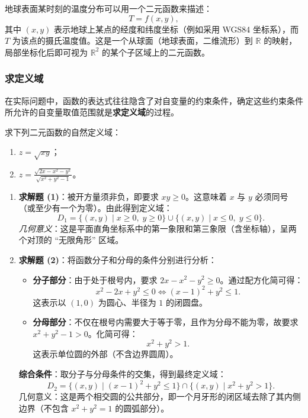 \documentclass[lang=cn,11pt]{elegantbook}
\begin{document}
\begin{exercise}[地表温度模型] \label{ex:temp-function}
地球表面某时刻的温度分布可以用一个二元函数来描述：
\[
T=f(x,y),
\]
其中 $(x,y)$ 表示地球上某点的经度和纬度坐标（例如采用 WGS84 坐标系），而 $T$ 为该点的摄氏温度值。这是一个从球面（地球表面，二维流形）到 $\mathbb{R}$ 的映射，局部坐标化后即可视为 $\mathbb{R}^2$ 的某个子区域上的二元函数。
\end{exercise}


\subsubsection*{求定义域}

在实际问题中，函数的表达式往往隐含了对自变量的约束条件，确定这些约束条件所允许的自变量取值范围就是\textbf{求定义域}的过程。

\begin{exercise}[求二元函数的定义域] \label{ex:domain-finding}
求下列二元函数的自然定义域：
\begin{enumerate}
  \item[(1)] $z=\sqrt{xy}$；
  \item[(2)] $\displaystyle z=\frac{\sqrt{2x-x^2-y^2}}{\sqrt{x^2+y^2-1}}$。
\end{enumerate}
\end{exercise}

\begin{solution}
\begin{enumerate}
  \item \textbf{求解题 (1)}：被开方量须非负，即要求 $xy\geq 0$。这意味着 $x$ 与 $y$ 必须同号（或至少有一个为零）。由此得到定义域：
  \[
  D_1=\{(x,y)\mid x\geq 0,\;y\geq 0\}\cup\{(x,y)\mid x\leqslant  0,\;y\leqslant  0\}.
  \]
  \textit{几何意义}：这是平面直角坐标系中的第一象限和第三象限（含坐标轴），呈两个对顶的 ``无限角形'' 区域。

  \item \textbf{求解题 (2)}：将函数分子和分母的条件分别进行分析：
  \begin{itemize}
    \item \textbf{分子部分}：由于处于根号内，要求 $2x-x^2-y^2\geq 0$。通过配方化简可得：
    \[
    x^2-2x+y^2\leqslant  0 \Longleftrightarrow (x-1)^2+y^2\leqslant  1.
    \]
    这表示以 $(1,0)$ 为圆心、半径为 $1$ 的闭圆盘。
    \item \textbf{分母部分}：不仅在根号内需要大于等于零，且作为分母不能为零，故要求 $x^2+y^2-1>0$。化简可得：
    \[
    x^2+y^2>1.
    \]
    这表示单位圆的外部（不含边界圆周）。
  \end{itemize}
  \textbf{综合条件}：取分子与分母条件的交集，得到最终定义域：
  \[
  D_2=\bigl\{(x,y)\mid (x-1)^2+y^2\leqslant  1\bigr\}\cap\bigl\{(x,y)\mid x^2+y^2>1\bigr\}.
  \]
  几何意义：这是两个相交圆的公共部分，即一个月牙形的闭区域去除了其内侧边界（不包含 $x^2+y^2=1$ 的圆弧部分）。
\end{enumerate}
\end{solution}
\end{document}
